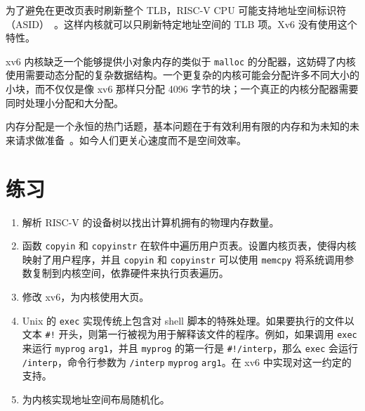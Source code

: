 为了避免在更改页表时刷新整个 TLB，RISC-V CPU 可能支持地址空间标识符（ASID）~\cite{riscv:priv}。这样内核就可以只刷新特定地址空间的 TLB 项。Xv6 没有使用这个特性。

xv6 内核缺乏一个能够提供小对象内存的类似于 {\tt malloc} 的分配器，这妨碍了内核使用需要动态分配的复杂数据结构。一个更复杂的内核可能会分配许多不同大小的小块，而不仅仅是像 xv6 那样只分配 4096 字节的块；一个真正的内核分配器需要同时处理小分配和大分配。

内存分配是一个永恒的热门话题，基本问题在于有效利用有限的内存和为未知的未来请求做准备~\cite{knuth}。如今人们更关心速度而不是空间效率。

\section{练习}
\begin{enumerate}
  
\item 解析 RISC-V 的设备树以找出计算机拥有的物理内存数量。

\item 函数 {\tt copyin} 和 {\tt copyinstr} 在软件中遍历用户页表。设置内核页表，使得内核映射了用户程序，并且 {\tt copyin} 和 {\tt copyinstr} 可以使用 {\tt memcpy} 将系统调用参数复制到内核空间，依靠硬件来执行页表遍历。

\item 修改 xv6，为内核使用大页。

\item Unix 的 \lstinline{exec} 实现传统上包含对 shell 脚本的特殊处理。如果要执行的文件以文本 \lstinline{#!} 开头，则第一行被视为用于解释该文件的程序。例如，如果调用 \lstinline{exec} 来运行 \lstinline{myprog} \lstinline{arg1}，并且 \lstinline{myprog} 的第一行是 \lstinline{#!/interp}，那么 \lstinline{exec} 会运行 \lstinline{/interp}，命令行参数为 \lstinline{/interp} \lstinline{myprog} \lstinline{arg1}。在 xv6 中实现对这一约定的支持。

\item 为内核实现地址空间布局随机化。

\end{enumerate}
